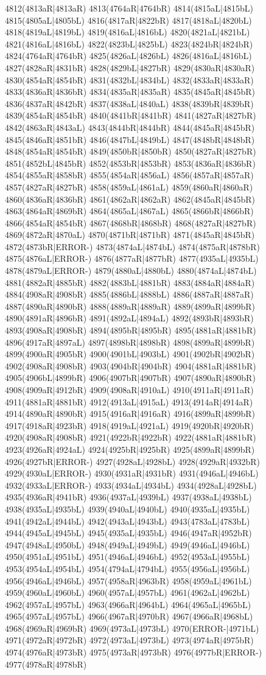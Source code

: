 4812(4813aR|4813aR) 4813(4764aR|4764bR) 4814(4815aL|4815bL) 4815(4805aL|4805bL) 4816(4817aR|4822bR) 4817(4818aL|4820bL) 4818(4819aL|4819bL) 4819(4816aL|4816bL) 4820(4821aL|4821bL) 4821(4816aL|4816bL) 4822(4823bL|4825bL) 4823(4824bR|4824bR) 4824(4764aR|4764bR) 4825(4826aL|4826bL) 4826(4816aL|4816bL) 4827(4828aR|4831bR) 4828(4829bL|4827bR) 4829(4830aR|4830aR) 4830(4854aR|4854bR) 4831(4832bL|4834bL) 4832(4833aR|4833aR) 4833(4836aR|4836bR) 4834(4835aR|4835aR) 4835(4845aR|4845bR) 4836(4837aR|4842bR) 4837(4838aL|4840aL) 4838(4839bR|4839bR) 4839(4854aR|4854bR) 4840(4841bR|4841bR) 4841(4827aR|4827bR) 4842(4863aR|4843aL) 4843(4844bR|4844bR) 4844(4845aR|4845bR) 4845(4846aR|4851bR) 4846(4847bL|4849bL) 4847(4848bR|4848bR) 4848(4854aR|4854bR) 4849(4850bR|4850bR) 4850(4827aR|4827bR) 4851(4852bL|4845bR) 4852(4853bR|4853bR) 4853(4836aR|4836bR) 4854(4855aR|4858bR) 4855(4854aR|4856aL) 4856(4857aR|4857aR) 4857(4827aR|4827bR) 4858(4859aL|4861aL) 4859(4860aR|4860aR) 4860(4836aR|4836bR) 4861(4862aR|4862aR) 4862(4845aR|4845bR) 4863(4864aR|4869bR) 4864(4865aL|4867aL) 4865(4866bR|4866bR) 4866(4854aR|4854bR) 4867(4868bR|4868bR) 4868(4827aR|4827bR) 4869(4872aR|4870aL) 4870(4871bR|4871bR) 4871(4845aR|4845bR) 4872(4873bR|ERROR-) 4873(4874aL|4874bL) 4874(4875aR|4878bR) 4875(4876aL|ERROR-) 4876(4877aR|4877bR) 4877(4935aL|4935bL) 4878(4879aL|ERROR-) 4879(4880aL|4880bL) 4880(4874aL|4874bL) 4881(4882aR|4885bR) 4882(4883bL|4881bR) 4883(4884aR|4884aR) 4884(4908aR|4908bR) 4885(4886bL|4888bL) 4886(4887aR|4887aR) 4887(4890aR|4890bR) 4888(4889aR|4889aR) 4889(4899aR|4899bR) 4890(4891aR|4896bR) 4891(4892aL|4894aL) 4892(4893bR|4893bR) 4893(4908aR|4908bR) 4894(4895bR|4895bR) 4895(4881aR|4881bR) 4896(4917aR|4897aL) 4897(4898bR|4898bR) 4898(4899aR|4899bR) 4899(4900aR|4905bR) 4900(4901bL|4903bL) 4901(4902bR|4902bR) 4902(4908aR|4908bR) 4903(4904bR|4904bR) 4904(4881aR|4881bR) 4905(4906bL|4899bR) 4906(4907bR|4907bR) 4907(4890aR|4890bR) 4908(4909aR|4912bR) 4909(4908aR|4910aL) 4910(4911aR|4911aR) 4911(4881aR|4881bR) 4912(4913aL|4915aL) 4913(4914aR|4914aR) 4914(4890aR|4890bR) 4915(4916aR|4916aR) 4916(4899aR|4899bR) 4917(4918aR|4923bR) 4918(4919aL|4921aL) 4919(4920bR|4920bR) 4920(4908aR|4908bR) 4921(4922bR|4922bR) 4922(4881aR|4881bR) 4923(4926aR|4924aL) 4924(4925bR|4925bR) 4925(4899aR|4899bR) 4926(4927bR|ERROR-) 4927(4928aL|4928bL) 4928(4929aR|4932bR) 4929(4930aL|ERROR-) 4930(4931aR|4931bR) 4931(4946aL|4946bL) 4932(4933aL|ERROR-) 4933(4934aL|4934bL) 4934(4928aL|4928bL) 4935(4936aR|4941bR) 4936(4937aL|4939bL) 4937(4938aL|4938bL) 4938(4935aL|4935bL) 4939(4940aL|4940bL) 4940(4935aL|4935bL) 4941(4942aL|4944bL) 4942(4943aL|4943bL) 4943(4783aL|4783bL) 4944(4945aL|4945bL) 4945(4935aL|4935bL) 4946(4947aR|4952bR) 4947(4948aL|4950bL) 4948(4949aL|4949bL) 4949(4946aL|4946bL) 4950(4951aL|4951bL) 4951(4946aL|4946bL) 4952(4953aL|4955bL) 4953(4954aL|4954bL) 4954(4794aL|4794bL) 4955(4956aL|4956bL) 4956(4946aL|4946bL) 4957(4958aR|4963bR) 4958(4959aL|4961bL) 4959(4960aL|4960bL) 4960(4957aL|4957bL) 4961(4962aL|4962bL) 4962(4957aL|4957bL) 4963(4966aR|4964bL) 4964(4965aL|4965bL) 4965(4957aL|4957bL) 4966(4967aR|4970bR) 4967(4966aR|4968bL) 4968(4969aR|4969bR) 4969(4973aL|4973bL) 4970(ERROR-|4971bL) 4971(4972aR|4972bR) 4972(4973aL|4973bL) 4973(4974aR|4975bR) 4974(4976aR|4973bR) 4975(4973aR|4973bR) 4976(4977bR|ERROR-) 4977(4978aR|4978bR) 